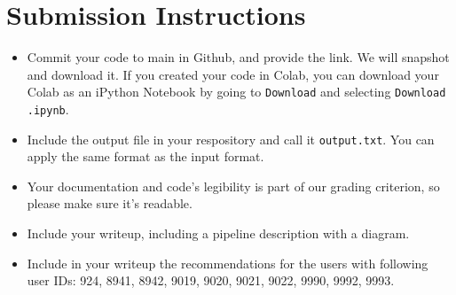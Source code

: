 \documentclass[paper=a4, fontsize=11pt]{scrartcl} %
\begin{document}
\section{Submission Instructions}

\begin{itemize}
    \item Commit your code to main in Github, and provide the link. We will snapshot and download it. If you created your code in Colab, you can download your Colab as an iPython Notebook by going to \verb"Download" and selecting \verb"Download .ipynb". 
    \item Include the output file in your respository and call it \verb"output.txt". You can apply the same format as the input format.
    \item Your documentation and code's legibility is part of our grading criterion, so please make sure it's readable.
    \item Include your writeup, including a pipeline description with a diagram.
    \item Include in your writeup the recommendations for the users with following user IDs: 924, 8941, 8942, 9019, 9020, 9021, 9022, 9990, 9992, 9993.
\end{itemize}
\end{document}
